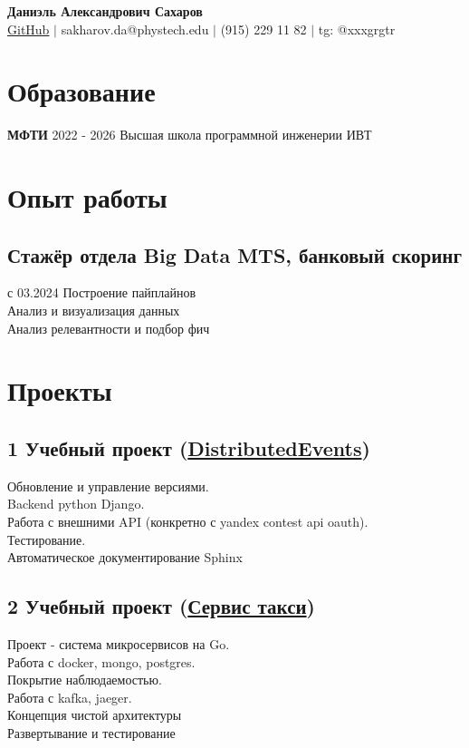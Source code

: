 \documentclass[a4paper,10pt]{article}
\begin{document}
\begin{center}
    \textbf{\LARGE Даниэль Александрович Сахаров} \\
    \vspace{5pt}
    \href{https://github.com/grgtr}{GitHub} $\vert$
    sakharov.da@phystech.edu $\vert$ 
    (915) 229 11 82 $\vert$ 
    tg: @xxxgrgtr
\end{center}

\section*{Образование}
\noindent
\textbf{МФТИ} \hfill 2022 - 2026
Высшая школа программной инженерии ИВТ

\section*{Опыт работы}
\noindent
\subsection*{Стажёр отдела Big Data MTS, банковый скоринг}
с 03.2024
Построение пайплайнов \\
Анализ и визуализация данных \\
Анализ релевантности и подбор фич

\section*{Проекты}
\noindent
\subsection*{1 Учебный проект (\href{https://github.com/hsse-distributed-events-team/devents-second-semester}{DistributedEvents})}
Обновление и управление версиями. \\
Backend python Django. \\
Работа с внешними API (конкретно с yandex contest api oauth). \\
Тестирование. \\
Автоматическое документирование Sphinx

\subsection*{2 Учебный проект (\href{https://github.com/VS-CDR/final-project_hsse}{Сервис такси})}
Проект - система микросервисов на Go. \\
Работа с docker, mongo, postgres. \\
Покрытие наблюдаемостью. \\
Работа с kafka, jaeger. \\
Концепция чистой архитектуры \\
Развертывание и тестирование
\end{document}
